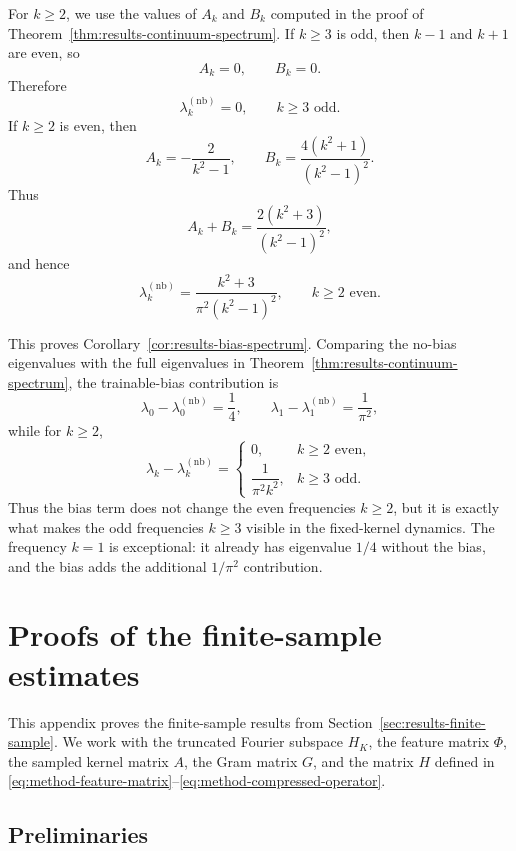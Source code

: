 For \(k\ge 2\), we use the values of \(A_k\) and \(B_k\) computed in the proof of
Theorem~\ref{thm:results-continuum-spectrum}. If \(k\ge 3\) is odd, then \(k-1\) and \(k+1\)
are even, so
\[
	A_k=0,
	\qquad
	B_k=0.
\]
Therefore
\begin{equation}
	\lambda_k^{(\mathrm{nb})}=0,
	\qquad
	k\ge 3 \text{ odd}.
	\label{eq:app-no-bias-odd}
\end{equation}
If \(k\ge 2\) is even, then
\[
	A_k=-\frac{2}{k^2-1},
	\qquad
	B_k=\frac{4(k^2+1)}{(k^2-1)^2}.
\]
Thus
\[
	A_k+B_k
	=
	\frac{2(k^2+3)}{(k^2-1)^2},
\]
and hence
\begin{equation}
	\lambda_k^{(\mathrm{nb})}
	=
	\frac{k^2+3}{\pi^2(k^2-1)^2},
	\qquad
	k\ge 2 \text{ even}.
	\label{eq:app-no-bias-even}
\end{equation}

This proves Corollary~\ref{cor:results-bias-spectrum}. Comparing the no-bias eigenvalues with
the full eigenvalues in Theorem~\ref{thm:results-continuum-spectrum}, the trainable-bias
contribution is
\[
	\lambda_0-\lambda_0^{(\mathrm{nb})}
	=
	\frac14,
	\qquad
	\lambda_1-\lambda_1^{(\mathrm{nb})}
	=
	\frac{1}{\pi^2},
\]
while for \(k\ge 2\),
\[
	\lambda_k-\lambda_k^{(\mathrm{nb})}
	=
	\begin{cases}
		0,                   & k\ge 2 \text{ even}, \\[0.8em]
		\dfrac{1}{\pi^2k^2}, & k\ge 3 \text{ odd}.
	\end{cases}
\]
Thus the bias term does not change the even frequencies \(k\ge 2\), but it is exactly what makes
the odd frequencies \(k\ge 3\) visible in the fixed-kernel dynamics. The frequency \(k=1\) is
exceptional: it already has eigenvalue \(1/4\) without the bias, and the bias adds the additional
\(1/\pi^2\) contribution.

\chapter{Proofs of the finite-sample estimates}
\label{app:finite-sample-proofs}

This appendix proves the finite-sample results from
Section~\ref{sec:results-finite-sample}. We work with the truncated Fourier subspace
\(H_K\), the feature matrix \(\Phi\), the sampled kernel matrix \(A\), the Gram matrix
\(G\), and the matrix \(H\) defined in
\eqref{eq:method-feature-matrix}--\eqref{eq:method-compressed-operator}.

\section{Preliminaries}
\label{sec:app-preliminaries}

